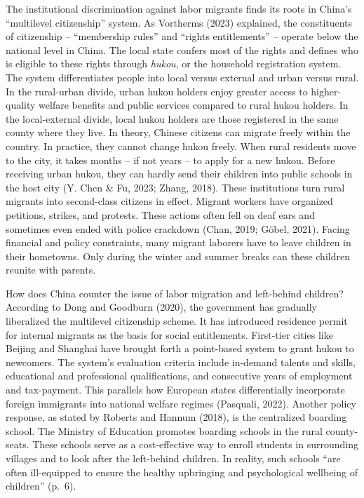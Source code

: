 \documentclass[
  man]{apa7}
\begin{document}
The institutional discrimination against labor migrants finds its roots in China's ``multilevel citizenship'' system. As Vortherms (2023) explained, the constituents of citizenship -- ``membership rules'' and ``rights entitlements'' -- operate below the national level in China. The local state confers most of the rights and defines who is eligible to these rights through \emph{hukou}, or the household registration system. The system differentiates people into local versus external and urban versus rural. In the rural-urban divide, urban hukou holders enjoy greater access to higher-quality welfare benefits and public services compared to rural hukou holders. In the local-external divide, local hukou holders are those registered in the same county where they live. In theory, Chinese citizens can migrate freely within the country. In practice, they cannot change hukou freely. When rural residents move to the city, it takes months -- if not years -- to apply for a new hukou. Before receiving urban hukou, they can hardly send their children into public schools in the host city (Y. Chen \& Fu, 2023; Zhang, 2018). These institutions turn rural migrants into second-class citizens in effect. Migrant workers have organized petitions, strikes, and protests. These actions often fell on deaf ears and sometimes even ended with police crackdown (Chan, 2019; Göbel, 2021). Facing financial and policy constraints, many migrant laborers have to leave children in their hometowns. Only during the winter and summer breaks can these children reunite with parents.

How does China counter the issue of labor migration and left-behind children? According to Dong and Goodburn (2020), the government has gradually liberalized the multilevel citizenship scheme. It has introduced residence permit for internal migrants as the basis for social entitlements. First-tier cities like Beijing and Shanghai have brought forth a point-based system to grant hukou to newcomers. The system's evaluation criteria include in-demand talents and skills, educational and professional qualifications, and consecutive years of employment and tax-payment. This parallels how European states differentially incorporate foreign immigrants into national welfare regimes (Pasquali, 2022). Another policy response, as stated by Roberts and Hannum (2018), is the centralized boarding school. The Ministry of Education promotes boarding schools in the rural county-seats. These schools serve as a cost-effective way to enroll students in surrounding villages and to look after the left-behind children. In reality, such schools ``are often ill-equipped to ensure the healthy upbringing and psychological wellbeing of children'' (p.~6).
\end{document}
